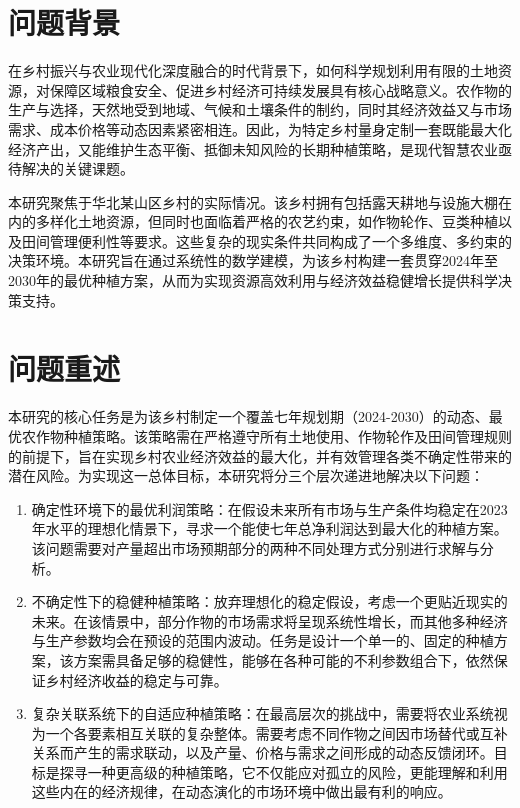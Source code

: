 \documentclass[withoutpreface,bwprint]{cumcmthesis} %
\begin{document}




\section{问题背景}

在乡村振兴与农业现代化深度融合的时代背景下，如何科学规划利用有限的土地资源，对保障区域粮食安全、促进乡村经济可持续发展具有核心战略意义。农作物的生产与选择，天然地受到地域、气候和土壤条件的制约，同时其经济效益又与市场需求、成本价格等动态因素紧密相连。因此，为特定乡村量身定制一套既能最大化经济产出，又能维护生态平衡、抵御未知风险的长期种植策略，是现代智慧农业亟待解决的关键课题。

本研究聚焦于华北某山区乡村的实际情况。该乡村拥有包括露天耕地与设施大棚在内的多样化土地资源，但同时也面临着严格的农艺约束，如作物轮作、豆类种植以及田间管理便利性等要求。这些复杂的现实条件共同构成了一个多维度、多约束的决策环境。本研究旨在通过系统性的数学建模，为该乡村构建一套贯穿2024年至2030年的最优种植方案，从而为实现资源高效利用与经济效益稳健增长提供科学决策支持。

\section{问题重述}

本研究的核心任务是为该乡村制定一个覆盖七年规划期（2024-2030）的动态、最优农作物种植策略。该策略需在严格遵守所有土地使用、作物轮作及田间管理规则的前提下，旨在实现乡村农业经济效益的最大化，并有效管理各类不确定性带来的潜在风险。为实现这一总体目标，本研究将分三个层次递进地解决以下问题：


\begin{enumerate}
    \item 确定性环境下的最优利润策略：在假设未来所有市场与生产条件均稳定在2023年水平的理想化情景下，寻求一个能使七年总净利润达到最大化的种植方案。该问题需要对产量超出市场预期部分的两种不同处理方式分别进行求解与分析。
    \item 不确定性下的稳健种植策略：放弃理想化的稳定假设，考虑一个更贴近现实的未来。在该情景中，部分作物的市场需求将呈现系统性增长，而其他多种经济与生产参数均会在预设的范围内波动。任务是设计一个单一的、固定的种植方案，该方案需具备足够的稳健性，能够在各种可能的不利参数组合下，依然保证乡村经济收益的稳定与可靠。
    \item 复杂关联系统下的自适应种植策略：在最高层次的挑战中，需要将农业系统视为一个各要素相互关联的复杂整体。需要考虑不同作物之间因市场替代或互补关系而产生的需求联动，以及产量、价格与需求之间形成的动态反馈闭环。目标是探寻一种更高级的种植策略，它不仅能应对孤立的风险，更能理解和利用这些内在的经济规律，在动态演化的市场环境中做出最有利的响应。
\end{enumerate}
\end{document}
